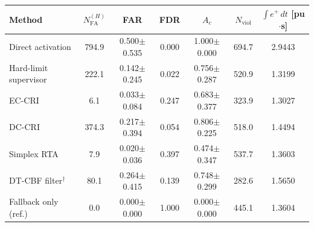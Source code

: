 \begin{tabular}{lcccccc}
\toprule
Method & $N_{\mathrm{FA}}^{(H)}$ & FAR & FDR & $A_c$ & $N_{\mathrm{viol}}$ & $\int e^{+}\,dt$ [pu$\cdot$s] \\
\midrule
Direct activation & 794.9 & 0.500$\pm$0.535 & 0.000 & 1.000$\pm$0.000 & 694.7 & 2.9443 \\
Hard-limit supervisor & 222.1 & 0.142$\pm$0.245 & 0.022 & 0.756$\pm$0.287 & 520.9 & 1.3199 \\
EC-CRI & 6.1 & 0.033$\pm$0.084 & 0.247 & 0.683$\pm$0.377 & 323.9 & 1.3027 \\
DC-CRI & 374.3 & 0.217$\pm$0.394 & 0.054 & 0.806$\pm$0.225 & 518.0 & 1.4494 \\
Simplex RTA & 7.9 & 0.020$\pm$0.036 & 0.397 & 0.474$\pm$0.347 & 537.7 & 1.3603 \\
DT-CBF filter$^{\dagger}$ & 80.1 & 0.264$\pm$0.415 & 0.139 & 0.748$\pm$0.299 & 282.6 & 1.5650 \\
Fallback only (ref.) & 0.0 & 0.000$\pm$0.000 & 1.000 & 0.000$\pm$0.000 & 445.1 & 1.3604 \\
\bottomrule
\end{tabular}